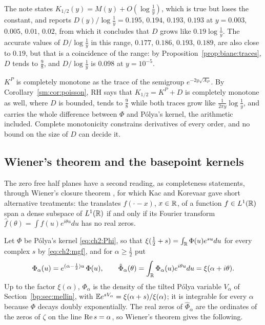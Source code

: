 The note \cite{P26bia} states $K_{1/2}(y)=M(y)+O(\log\frac1y)$, which is true but loses the constant, and reports $D(y)/\log\frac1y=0.195$, $0.194$, $0.193$, $0.193$ at $y=0.003$, $0.005$, $0.01$, $0.02$, from which it concludes that $D$ grows like $0.19\log\frac1y$. The accurate values of $D/\log\frac1y$ in this range, $0.177$, $0.186$, $0.193$, $0.189$, are also close to $0.19$, but that is a coincidence of the range: by Proposition~\ref{prop:biane:traces}, $D$ tends to $\frac98$, and $D/\log\frac1y$ is $0.098$ at $y=10^{-5}$.

$K^P$ is completely monotone as the trace of the semigroup $e^{-2y\sqrt{A_P}}$. By Corollary~\ref{sm:cor:poisson}, RH says that $K_{1/2}=K^P+D$ is completely monotone as well, where $D$ is bounded, tends to $\frac98$ while both traces grow like $\frac1{2\pi y}\log\frac1y$, and carries the whole difference between $\Phi$ and P\'olya's kernel, the arithmetic included. Complete monotonicity constrains derivatives of every order, and no bound on the size of $D$ can decide it.

\subsection{Wiener's theorem and the basepoint kernels}\label{wr:sec:wiener}

The zero free half planes have a second reading, as completeness statements, through Wiener's closure theorem \cite{Wiener32}, for which Kac \cite{Kac65} and Korevaar \cite{Korevaar65} gave short alternative treatments: the translates $f(\cdot-x)$, $x\in\mathbb{R}$, of a function $f\in L^1(\mathbb{R})$ span a dense subspace of $L^1(\mathbb{R})$ if and only if its Fourier transform $\hat f(\theta)=\int f(u)e^{i\theta u}du$ has no real zeros.

Let $\Phi$ be P\'olya's kernel \eqref{eq:ch2:Phi}, so that $\xi(\frac12+s)=\int_{\mathbb{R}}\Phi(u)e^{su}du$ for every complex $s$ by \eqref{eq:ch2:mgf}, and for $\alpha\ge\frac12$ put
\begin{equation}\label{wr:eq:kernel}
\Phi_\alpha(u)=e^{(\alpha-\frac12)u}\,\Phi(u),\qquad \hat\Phi_\alpha(\theta)=\int_{\mathbb{R}}\Phi_\alpha(u)e^{i\theta u}du=\xi(\alpha+i\theta).
\end{equation}
Up to the factor $\xi(\alpha)$, $\Phi_\alpha$ is the density of the tilted P\'olya variable $V_\alpha$ of Section~\ref{bp:sec:mellin}, with $\mathbb{E} e^{sV_\alpha}=\xi(\alpha+s)/\xi(\alpha)$; it is integrable for every $\alpha$ because $\Phi$ decays doubly exponentially. The real zeros of $\hat\Phi_\alpha$ are the ordinates of the zeros of $\zeta$ on the line $\operatorname{Re} s=\alpha$, so Wiener's theorem gives the following.


